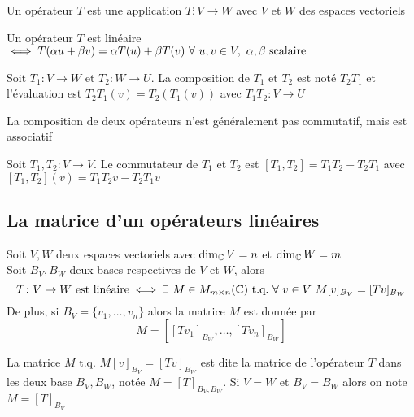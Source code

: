\begin{definition}
    Un opérateur $T$ est une application $T\colon V \to W$ avec $V$ et $W$ des espaces vectoriels
\end{definition}
\begin{definition}
    Un opérateur $T$ est linéaire $\iff T(\alpha u + \beta v) = \alpha T(u) + \beta T(v) \ \forall \ u, v \in V, \ \alpha, \beta \text{ scalaire}$ 
\end{definition}
\begin{definition}
    Soit $T_1 \colon V \to W$ et $T_2 \colon W \to U$. La composition de $T_1$ et $T_2$ est noté
    $T_2 T_1$ et l'évaluation est $T_2 T_1 (v) = T_2(T_1(v))$ avec $T_1 T_2 \colon V \to U$
\end{definition}
\begin{remark}
    La composition de deux opérateurs n'est généralement pas commutatif, mais est associatif
\end{remark}
\begin{definition}
    Soit $T_1, T_2 \colon V \to V$. Le commutateur de $T_1$ et $T_2$ est 
    $[T_1, T_2] = T_1T_2 - T_2T_1$ avec $[T_1, T_2](v) = T_1T_2v - T_2T_1v$
\end{definition}

\subsection{La matrice d'un opérateurs linéaires}
\begin{theorem}
    Soit $V, W$ deux espaces vectoriels avec $\dim_{\mathbb{C}} V = n$ et $\dim_{\mathbb{C}} W = m$ \\
    Soit $B_V, B_W$ deux bases respectives de $V$ et $W$, alors 
    \[
    T\colon V \to W \ \text{est linéaire} \iff \exists \ M \in M_{m \times n}(\C) \ \text{t.q.} \ 
    \forall \ v \in V \ M[v]_{B_V} = [Tv]_{B_W}
    \]  
    De plus, si $B_V = \{v_1, \dots, v_n\}$ alors la matrice $M$ est donnée par 
    \[
    M = \left[ \left[ Tv_1 \right]_{B_W}, \dots, \left[ Tv_n \right]_{B_W} \right]
    \]
\end{theorem}
\begin{definition}
    La matrice $M$ t.q. $M[v]_{B_V} = [Tv]_{B_W}$ est dite la matrice de l'opérateur $T$
    dans les deux base $B_V, B_W$, notée $M = [T]_{B_V, B_W}$. Si $V = W$ et $B_V = B_W$
    alors on note $M = [T]_{B_V}$
\end{definition}

